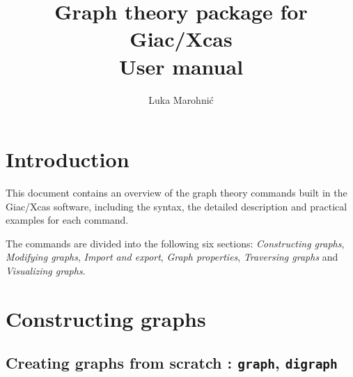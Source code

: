 \documentclass[a4paper,11pt]{article}
\title{\textbf{Graph theory package for Giac/Xcas}\\User manual}
\author{Luka Marohnić}
\begin{document}
\maketitle
\tableofcontents

\section{Introduction}

This document contains an overview of the graph theory commands built in the Giac/Xcas software, including the syntax, the detailed description and practical examples for each command.

The commands are divided into the following six sections: \emph{Constructing graphs}, \emph{Modifying graphs}, \emph{Import and export}, \emph{Graph properties}, \emph{Traversing graphs} and \emph{Visualizing graphs}.

\section{Constructing graphs}

\subsection{Creating graphs from scratch : {\tt graph}, {\tt digraph}}
\end{document}
